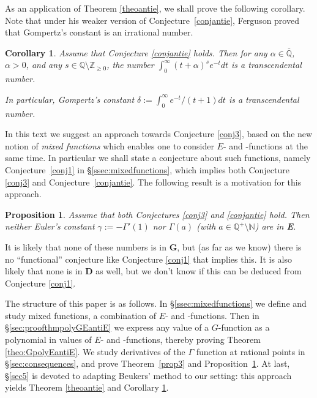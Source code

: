 \documentclass[reqno,12pt]{article}
\numberwithin{equation}{section}
\newtheorem{coro}{Corollary}
\newtheorem{prop}{Proposition}
\theoremstyle{remark}
\newcommand{\Qbar}{\overline{\mathbb Q}}
\newcommand{\tantie}{{\fontencoding{OT2}\fontfamily{wncyr}\selectfont\CYREREV}}
\newcommand{\antie}{\text{\tantie}}
\begin{document}
As an application of Theorem \ref{theoantie}, we shall prove the following corollary. Note that under his weaker version of Conjecture~\ref{conjantie}, Ferguson \cite[p.~171, Theorem 2]{ferguson} proved that Gompertz's constant is an irrational number.

\begin{coro} \label{coro:0701} 
Assume that Conjecture \ref{conjantie} holds. Then for any $\alpha\in \Qbar$, $\alpha>0$, and any $s\in \mathbb Q \setminus \mathbb Z_{\ge 0}$, the number $\int_0^\infty (t+\alpha)^s e^{-t}dt$ is a transcendental number.

In particular, Gompertz's constant $\delta:=\int_0^\infty e^{-t}/(t+1) dt$ is a transcendental number.
\end{coro}

In this text we suggest an approach towards Conjecture \ref{conj3}, based on the new notion of {\em mixed functions} which enables one to consider $E$- and \tantie-functions at the same time. In particular we shall state a conjecture about such functions, namely Conjecture~\ref{conj1} in \S\ref{ssec:mixedfunctions}, which implies both Conjecture \ref{conj3} and Conjecture~\ref{conjantie}. The following result is a motivation for this approach.

\begin{prop}\label{proppasdansE}
 Assume that both Conjectures \ref{conj3} and \ref{conjantie} hold. Then 
neither Euler's constant $\gamma:=-\Gamma'(1)$ nor $\Gamma(a)$ (with $a\in \mathbb Q^+\setminus \mathbb N$) are in {\bf E}.
\end{prop}

It is likely that none of these numbers   is  in {\bf G}, but (as far as we know) there is no ``functional'' conjecture like Conjecture \ref{conj1} that implies this. It is also likely that none is in  {\bf D} as well, but we don't know if this can be deduced from Conjecture \ref{conj1}.


\bigskip

The structure of this paper is as follows. In \S \ref{ssec:mixedfunctions} we define and study mixed functions, a combination of $E$- and \antie-functions. Then in \S \ref{sec:proofthmpolyGEantiE} we express any value of  a $G$-function as a polynomial in values of $E$- and \antie-functions, thereby proving Theorem \ref{theo:GpolyEantiE}.
We study derivatives of the $\Gamma $ function at rational points  in \S \ref{sec:consequences}, and prove  Theorem~\ref{prop3} and Proposition~\ref{proppasdansE}. At last, \S \ref{sec5} is devoted to adapting  Beukers' method to our setting: this approach yields  Theorem \ref{theoantie} and Corollary \ref{coro:0701}.
\end{document}
